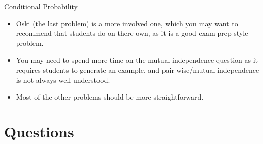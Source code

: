 \documentclass{exam}
\begin{document}
\begin{questions}
\begin{itemize}
    \end{itemize}
  \item Conditional Probability
    \begin{itemize}
      \item Oski (the last problem) is a more involved one, which you may want to recommend that students do on there own, as it is a good exam-prep-style problem.
      \item You may need to spend more time on the mutual independence question as it requires students to generate an example, and pair-wise/mutual independence is not always well understood.
      \item Most of the other problems should be more straightforward.
    \end{itemize}
\end{questions}

\section{Questions}
\end{document}
